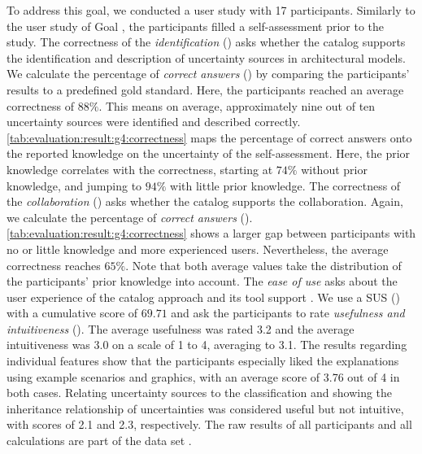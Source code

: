 To address this goal, we conducted a user study with 17 participants.
Similarly to the user study of Goal , the participants filled a self-assessment prior to the study.
The correctness of the \emph{identification} () asks whether the catalog supports the identification and description of uncertainty sources in architectural models.
We calculate the percentage of \emph{correct answers} () by comparing the participants' results to a predefined gold standard.
Here, the participants reached an average correctness of $88\%$.
This means on average, approximately nine out of ten uncertainty sources were identified and described correctly.
\autoref{tab:evaluation:result:g4:correctness} maps the percentage of correct answers onto the reported knowledge on the uncertainty of the self-assessment.
Here, the prior knowledge correlates with the correctness, starting at $74\%$ without prior knowledge, and jumping to $94\%$ with little prior knowledge.
The correctness of the \emph{collaboration} () asks whether the catalog supports the collaboration.
Again, we calculate the percentage of \emph{correct answers} ().
\autoref{tab:evaluation:result:g4:correctness} shows a larger gap between participants with no or little knowledge and more experienced users.
Nevertheless, the average correctness reaches $65\%$.
Note that both average values take the distribution of the participants' prior knowledge into account.
The \emph{ease of use} asks about the user experience of the catalog approach and its tool support \arcen.
We use a \ac{SUS} () with a cumulative score of $69.71$ and ask the participants to rate \emph{usefulness and intuitiveness} (). 
The average usefulness was rated 3.2 and the average intuitiveness was 3.0 on a scale of 1 to 4, averaging to 3.1.
The results regarding individual features show that the participants especially liked the explanations using example scenarios and graphics, with an average score of 3.76 out of 4 in both cases.
Relating uncertainty sources to the classification and showing the inheritance relationship of uncertainties was considered useful but not intuitive, with scores of 2.1 and 2.3, respectively.
The raw results of all participants and all calculations are part of the data set \cite{dataset}. 

